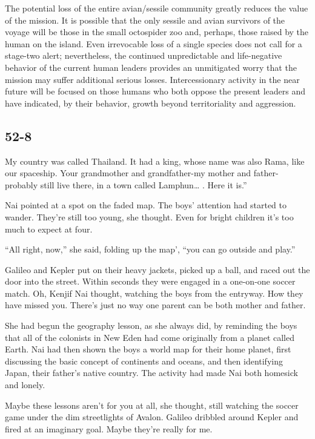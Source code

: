 \documentclass[]{article}
\begin{document}
{{The potential loss of the entire avian/sessile community greatly reduces the value of the mission. It is possible that the only sessile and avian survivors of the voyage will be those in the small octospider zoo and, perhaps, those raised by the human on the island. Even irrevocable loss of a single species does not call for a stage-two alert; nevertheless, the continued unpredictable and life-negative behavior of the current human leaders provides an unmitigated worry that the mission may suffer additional serious losses. Intercessionary activity in the near future will be focused on those humans who both oppose the present leaders and have indicated, by their behavior, growth beyond territoriality and aggression.


\subsection{52-8}

My country was called Thailand. It had a king, whose name was also Rama, like our spaceship. Your grandmother and grandfather-my mother and father-probably still live there, in a town called Lamphun… . Here it is.”

Nai pointed at a spot on the faded map. The boys’ attention had started to wander. They’re still too young, she thought. Even for bright children it’s too much to expect at four.

“All right, now,” she said, folding up the map’, “you can go outside and play.”

Galileo and Kepler put on their heavy jackets, picked up a ball, and raced out the door into the street. Within seconds they were engaged in a one-on-one soccer match. Oh, Kenjif Nai thought, watching the boys from the entryway. How they have missed you. There’s just no way one parent can be both mother and father.

She had begun the geography lesson, as she always did, by reminding the boys that all of the colonists in New Eden had come originally from a planet called Earth. Nai had then shown the boys a world map for their home planet, first discussing the basic concept of continents and oceans, and then identifying Japan, their father’s native country. The activity had made Nai both homesick and lonely.

Maybe these lessons aren’t for you at all, she thought, still watching the soccer game under the dim streetlights of Avalon. Galileo dribbled around Kepler and fired at an imaginary goal. Maybe they’re really for me.

}}
\end{document}
